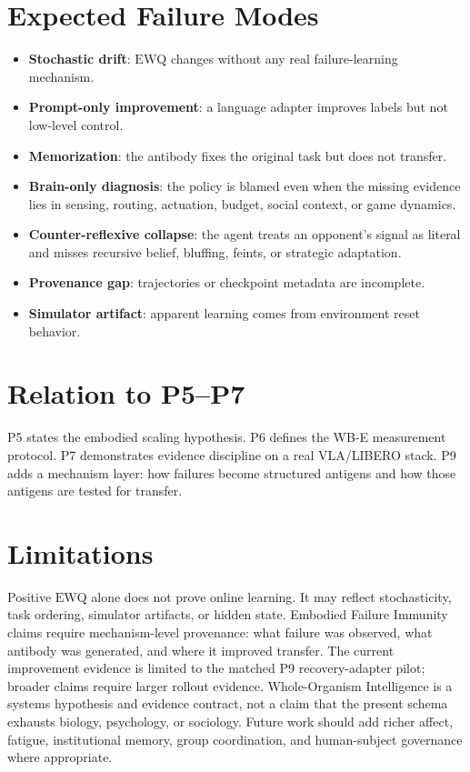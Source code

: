 \documentclass[11pt]{article}
\begin{document}
\section{Expected Failure Modes}

\begin{itemize}[leftmargin=*]
  \item \textbf{Stochastic drift}: $\mathrm{EWQ}$ changes without any real failure-learning mechanism.
  \item \textbf{Prompt-only improvement}: a language adapter improves labels but not low-level control.
  \item \textbf{Memorization}: the antibody fixes the original task but does not transfer.
  \item \textbf{Brain-only diagnosis}: the policy is blamed even when the missing evidence lies in sensing, routing, actuation, budget, social context, or game dynamics.
  \item \textbf{Counter-reflexive collapse}: the agent treats an opponent's signal as literal and misses recursive belief, bluffing, feints, or strategic adaptation.
  \item \textbf{Provenance gap}: trajectories or checkpoint metadata are incomplete.
  \item \textbf{Simulator artifact}: apparent learning comes from environment reset behavior.
\end{itemize}

\section{Relation to P5--P7}

P5 states the embodied scaling hypothesis.
P6 defines the WB-E measurement protocol.
P7 demonstrates evidence discipline on a real VLA/LIBERO stack.
P9 adds a mechanism layer: how failures become structured antigens and how those antigens are tested for transfer.

\section{Limitations}

Positive $\mathrm{EWQ}$ alone does not prove online learning.
It may reflect stochasticity, task ordering, simulator artifacts, or hidden state.
Embodied Failure Immunity claims require mechanism-level provenance: what failure was observed, what antibody was generated, and where it improved transfer.
The current improvement evidence is limited to the matched P9 recovery-adapter pilot; broader claims require larger rollout evidence.
Whole-Organism Intelligence is a systems hypothesis and evidence contract, not a claim that the present schema exhausts biology, psychology, or sociology.
Future work should add richer affect, fatigue, institutional memory, group coordination, and human-subject governance where appropriate.
\end{document}
